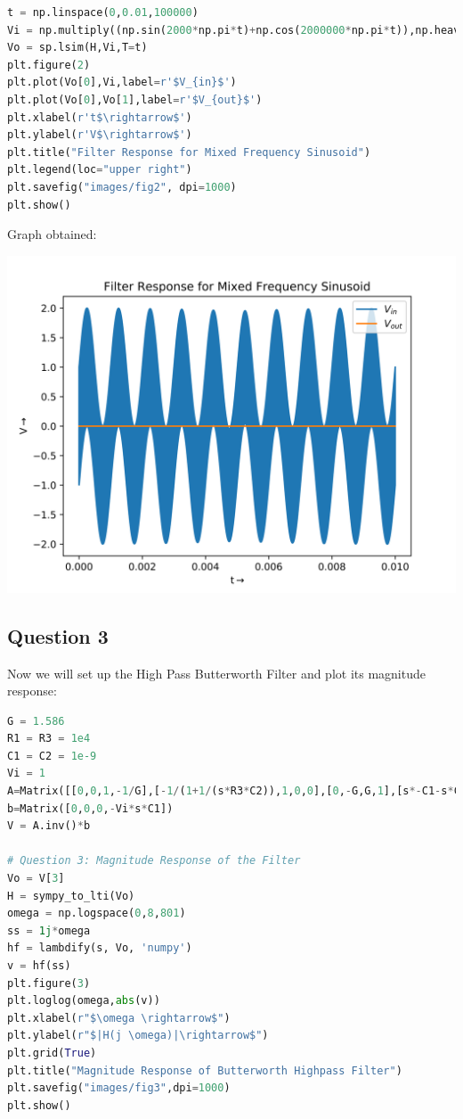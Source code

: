 \documentclass[12pt]{article}
\begin{document}
\begin{lstlisting}[language=Python]
t = np.linspace(0,0.01,100000)
Vi = np.multiply((np.sin(2000*np.pi*t)+np.cos(2000000*np.pi*t)),np.heaviside(t,0.5))
Vo = sp.lsim(H,Vi,T=t)
plt.figure(2)
plt.plot(Vo[0],Vi,label=r'$V_{in}$')
plt.plot(Vo[0],Vo[1],label=r'$V_{out}$')
plt.xlabel(r't$\rightarrow$')
plt.ylabel(r'V$\rightarrow$')
plt.title("Filter Response for Mixed Frequency Sinusoid")
plt.legend(loc="upper right")
plt.savefig("images/fig2", dpi=1000)
plt.show()
\end{lstlisting}
Graph obtained:
\begin{center}
    \includegraphics[scale=0.8]{images/fig2.png}
\end{center}

\pagebreak
\subsection{Question 3}

Now we will set up the High Pass Butterworth Filter and plot its magnitude response:

\begin{lstlisting}[language=Python]
G = 1.586
R1 = R3 = 1e4
C1 = C2 = 1e-9
Vi = 1
A=Matrix([[0,0,1,-1/G],[-1/(1+1/(s*R3*C2)),1,0,0],[0,-G,G,1],[s*-C1-s*C2-1/R1,s*C2,0,1/R1]])
b=Matrix([0,0,0,-Vi*s*C1])
V = A.inv()*b

# Question 3: Magnitude Response of the Filter
Vo = V[3]
H = sympy_to_lti(Vo)
omega = np.logspace(0,8,801)
ss = 1j*omega
hf = lambdify(s, Vo, 'numpy')
v = hf(ss)
plt.figure(3)
plt.loglog(omega,abs(v))
plt.xlabel(r"$\omega \rightarrow$")
plt.ylabel(r"$|H(j \omega)|\rightarrow$")
plt.grid(True)
plt.title("Magnitude Response of Butterworth Highpass Filter")
plt.savefig("images/fig3",dpi=1000)
plt.show()
\end{lstlisting}
\end{document}
